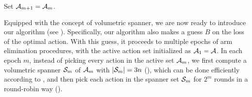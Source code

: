 \begin{algorithm}
{    
    
    \nl Set ${\mathcal{A}}_{m+1} = {\mathcal{A}}_m$.
    
    \nl {}
}
\end{algorithm}

Equipped with the concept of volumetric spanner, we are now ready to introduce our algorithm (see ). 
Specifically, our algorithm also makes a guess $B$ on the loss of the optimal action. 
With this guess, it proceeds to multiple epochs of arm elimination procedures, with the active action set initialized as ${\mathcal{A}}_1 = {\mathcal{A}}$.
In each epoch $m$, instead of picking every action in the active set ${\mathcal{A}}_m$, we first compute a volumetric spanner ${\mathcal{S}}_m$ of ${\mathcal{A}}_m$ with $|{\mathcal{S}}_m|=3n$ (), which can be done efficiently according to , 
and then pick each action in the spanner set ${\mathcal{S}}_m$ for $2^m$ rounds in a round-robin way ().

